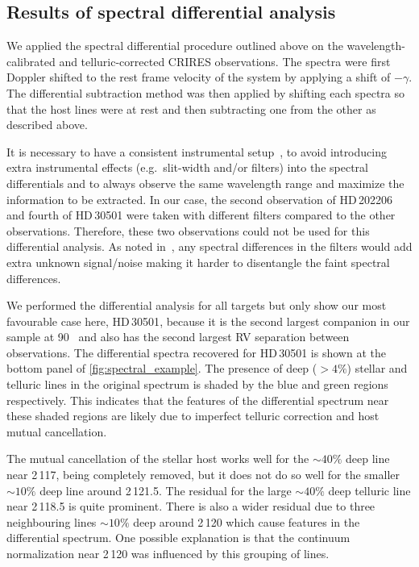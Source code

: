 \subsection{Results of spectral differential analysis}
\label{subsec:differential_results}

We applied the spectral differential procedure outlined above on the wavelength-calibrated and telluric-corrected {CRIRES} observations.
The spectra were first Doppler shifted to the rest frame velocity of the system by applying a shift of \(-\gamma\).
The differential subtraction method was then applied by shifting each spectra so that the host lines were at rest and then subtracting one from the other as described above.

It is necessary to have a consistent instrumental setup~\citep{ferluga_separating_1997}, to avoid introducing extra instrumental effects (e.g.\ slit-width and/or filters) into the spectral differentials and to always observe the same wavelength range and maximize the information to be extracted.
In our case, the second observation of {HD\,202206} and fourth of {HD\,30501} were taken with different filters compared to the other observations.
Therefore, these two observations could not be used for this differential analysis.
As noted in~\citet{hadrava_disentangling_2009}, any spectral differences in the filters would add extra unknown signal/noise making it harder to disentangle the faint spectral differences.

We performed the differential analysis for all targets but only show our most favourable case here, {HD\,30501}, because it is the second largest companion in our sample at 90~\Mjup{} and also has the second largest {RV} separation between observations.
The differential spectra recovered for {HD\,30501} is shown at the bottom panel of \cref{fig:spectral_example}.
The presence of deep (\(>4\%\)) stellar and telluric lines in the original spectrum is shaded by the blue and green regions respectively.
This indicates that the features of the differential spectrum near these shaded regions are likely due to imperfect telluric correction and host mutual cancellation.

The mutual cancellation of the stellar host works well for the \(\sim40\%\) deep line near 2\,117\nm{}, being completely removed, but it does not do so well for the smaller \(\sim10\%\) deep line around 2\,121.5\nm{}.
The residual for the large \(\sim40\%\) deep telluric line near 2\,118.5\nm{} is quite prominent.
There is also a wider residual due to three neighbouring lines \(\sim10\%\) deep around 2\,120\nm{} which cause features in the differential spectrum.
One possible explanation is that the continuum normalization near 2\,120\nm{} was influenced by this grouping of lines.

